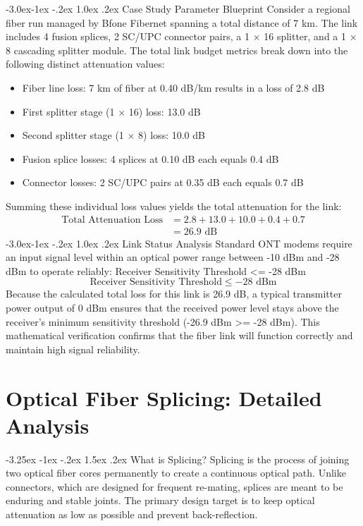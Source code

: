 \documentclass[11pt,a4paper]{report}
\makeatletter
\renewcommand{\section}{\@startsection{section}{1}{\z@}%
  {-3.25ex \@plus -1ex \@minus -.2ex}%
  {1.5ex \@plus.2ex}%
  {\normalfont\Large\bfseries\color{primaryColor}}}
\renewcommand{\subsection}{\@startsection{subsection}{2}{\z@}%
  {-3.0ex\@plus -1ex \@minus -.2ex}%
  {1.0ex \@plus .2ex}%
  {\normalfont\large\bfseries\color{secondaryColor}}}
\makeatother
\begin{document}
\subsection{Case Study Parameter Blueprint}
Consider a regional fiber run managed by Bfone Fibernet spanning a total distance of 7 km. The link includes 4 fusion splices, 2 SC/UPC connector pairs, a 1 $\times$ 16 splitter, and a 1 $\times$ 8 cascading splitter module. The total link budget metrics break down into the following distinct attenuation values:
\begin{itemize}
  \item Fiber line loss: 7 km of fiber at 0.40 dB/km results in a loss of 2.8 dB
  \item First splitter stage (1 $\times$ 16) loss: 13.0 dB
  \item Second splitter stage (1 $\times$ 8) loss: 10.0 dB
  \item Fusion splice losses: 4 splices at 0.10 dB each equals 0.4 dB
  \item Connector losses: 2 SC/UPC pairs at 0.35 dB each equals 0.7 dB
\end{itemize}
Summing these individual loss values yields the total attenuation for the link:
\begin{align*} \text{Total Attenuation Loss} &= 2.8 + 13.0 + 10.0 + 0.4 + 0.7 \\ &= 26.9\text{ dB} \end{align*}
\subsection{Link Status Analysis}
Standard ONT modems require an input signal level within an optical power range between -10 dBm and -28 dBm to operate reliably: Receiver Sensitivity Threshold <= -28 dBm
\begin{equation}\text{Receiver Sensitivity Threshold} \le -28\text{ dBm}\end{equation}
Because the calculated total loss for this link is 26.9 dB, a typical transmitter power output of 0 dBm ensures that the received power level stays above the receiver's minimum sensitivity threshold (-26.9 dBm >= -28 dBm). This mathematical verification confirms that the fiber link will function correctly and maintain high signal reliability.
\chapter{Optical Fiber Splicing: Detailed Analysis}
\section{What is Splicing?}
Splicing is the process of joining two optical fiber cores permanently to create a continuous optical path. Unlike connectors, which are designed for frequent re-mating, splices are meant to be enduring and stable joints. The primary design target is to keep optical attenuation as low as possible and prevent back-reflection.
\end{document}
